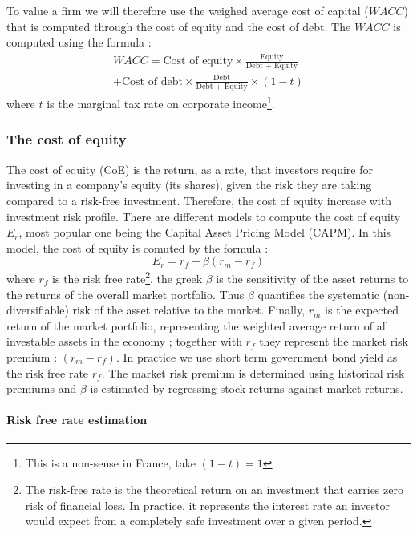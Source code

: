 To value a firm we will therefore use the weighed average cost of capital ($WACC$) that is computed through the cost of equity and the cost of debt. The $WACC$ is computed using the formula : 
\begin{multline}
        WACC = \text{Cost of equity}  \times \frac{\text{Equity}}{\text{Debt + Equity}} \\+ \text{Cost of debt} \times \frac{\text{Debt}}{\text{Debt + Equity}} \times (1-t)
\end{multline}
where $t$ is the marginal tax rate on corporate income\footnote{This is a non-sense in France, take $(1-t) = 1$}.


\subsubsection{The cost of equity}

The cost of equity (CoE) is the return, as a rate, that investors require for investing in a company's equity (its shares), given the risk they are taking compared to a risk-free investment. Therefore, the cost of equity increase with investment risk profile. There are different models to compute the cost of equity $E_r$, most popular one being the Capital Asset Pricing Model (CAPM). In this model, the cost of equity is comuted by the formula : 
\begin{equation}
    E_r = r_f +\beta(r_m - r_f)
\end{equation}
where $r_f$ is the risk free rate\footnote{The risk-free rate is the theoretical return on an investment that carries zero risk of financial loss.
In practice, it represents the interest rate an investor would expect from a completely safe investment over a given period.}, the greek $\beta$ is the sensitivity of the asset returns to the returns of the overall market portfolio. Thus $\beta$ quantifies the systematic (non-diversifiable) risk of the asset relative to the market. Finally, $r_m$ is the  expected return of the market portfolio, representing the weighted average return of all investable assets in the economy ; together with $r_f$ they represent the market risk premium : $(r_m - r_f)$. In practice we use short term government bond yield as the risk free rate $r_f$. The market risk premium is determined using historical risk premiums and $\beta$ is estimated by regressing stock returns against market returns. 

\paragraph{Risk free rate estimation}

